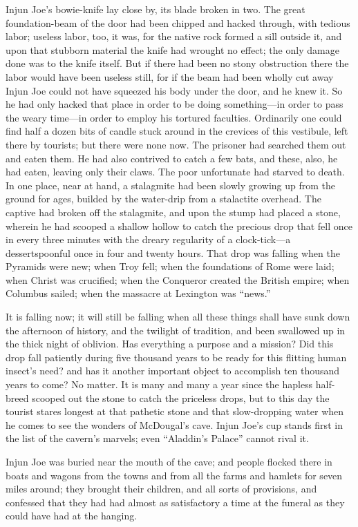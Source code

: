 \documentclass{book}
\begin{document}
Injun Joe’s bowie-knife lay close by, its blade broken in two. The great foundation-beam of the door had been chipped and hacked through, with tedious labor; useless labor, too, it was, for the native rock formed a sill outside it, and upon that stubborn material the knife had wrought no effect; the only damage done was to the knife itself. But if there had been no stony obstruction there the labor would have been useless still, for if the beam had been wholly cut away Injun Joe could not have squeezed his body under the door, and he knew it. So he had only hacked that place in order to be doing something—in order to pass the weary time—in order to employ his tortured faculties. Ordinarily one could find half a dozen bits of candle stuck around in the crevices of this vestibule, left there by tourists; but there were none now. The prisoner had searched them out and eaten them. He had also contrived to catch a few bats, and these, also, he had eaten, leaving only their claws. The poor unfortunate had starved to death. In one place, near at hand, a stalagmite had been slowly growing up from the ground for ages, builded by the water-drip from a stalactite overhead. The captive had broken off the stalagmite, and upon the stump had placed a stone, wherein he had scooped a shallow hollow to catch the precious drop that fell once in every three minutes with the dreary regularity of a clock-tick—a dessertspoonful once in four and twenty hours. That drop was falling when the Pyramids were new; when Troy fell; when the foundations of Rome were laid; when Christ was crucified; when the Conqueror created the British empire; when Columbus sailed; when the massacre at Lexington was “news.”

It is falling now; it will still be falling when all these things shall have sunk down the afternoon of history, and the twilight of tradition, and been swallowed up in the thick night of oblivion. Has everything a purpose and a mission? Did this drop fall patiently during five thousand years to be ready for this flitting human insect’s need? and has it another important object to accomplish ten thousand years to come? No matter. It is many and many a year since the hapless half-breed scooped out the stone to catch the priceless drops, but to this day the tourist stares longest at that pathetic stone and that slow-dropping water when he comes to see the wonders of McDougal’s cave. Injun Joe’s cup stands first in the list of the cavern’s marvels; even “Aladdin’s Palace” cannot rival it.

Injun Joe was buried near the mouth of the cave; and people flocked there in boats and wagons from the towns and from all the farms and hamlets for seven miles around; they brought their children, and all sorts of provisions, and confessed that they had had almost as satisfactory a time at the funeral as they could have had at the hanging.
\end{document}
